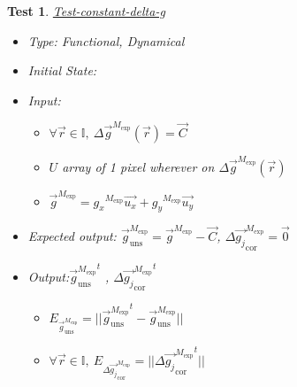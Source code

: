 \documentclass[12pt, titlepage]{article}
\newtheorem{Test}{Test}
\begin{document}
\begin{Test}\normalfont\underline{Test-constant-delta-g}
\label{T_constant-delta-g}
\begin{itemize}
\item Type: Functional, Dynamical
\item Initial State: 
\item Input: 
	\begin{itemize}
	\item $\forall \vec{r} \in \mathbb{I}, \  \Delta \overrightarrow{g}^{M_{\text{exp}}}(\vec{r})=\overrightarrow{C}$
	\item $U$ array of 1 pixel wherever on $\Delta \overrightarrow{g}^{M_{\text{exp}}}(\vec{r})$
	\item $\overrightarrow{g}^{M_{\text{exp}}}={g_x}^{M_{\text{exp}}}\overrightarrow{u_x}+{g_y}^{M_{\text{exp}}}\overrightarrow{u_y}$
	\end{itemize} 
\item Expected output: $\overrightarrow{g}_{\text{uns}}^{M_{\text{exp}}}=\overrightarrow{g}^{M_{\text{exp}}}-\overrightarrow{C}$, $\Delta\overrightarrow{g_{j}}_{\text{cor}}^{M_{\text{exp}}}=\overrightarrow{0}$
\item Output:${\overrightarrow{g}_{\text{uns}}^{M_{\text{exp}}}}^{t}$ , ${\Delta\overrightarrow{g_{j}}_{\text{cor}}^{M_{\text{exp}}}}^{t}$
	\begin{itemize}
	\item $E_{\overrightarrow{g}_{\text{uns}}^{M_{\text{exp}}}}=||{\overrightarrow{g}_{\text{uns}}^{M_{\text{exp}}}}^{t}-\overrightarrow{g}_{\text{uns}}^{M_{\text{exp}}}||$
	\item $\forall \vec{r} \in \mathbb{I}, \ E_{\Delta\overrightarrow{g_{j}}_{\text{cor}}^{M_{\text{exp}}}}=||{\Delta\overrightarrow{g_{j}}_{\text{cor}}^{M_{\text{exp}}}}^{t}||$
\end{itemize}

\end{itemize}
\end{Test}
\end{document}
